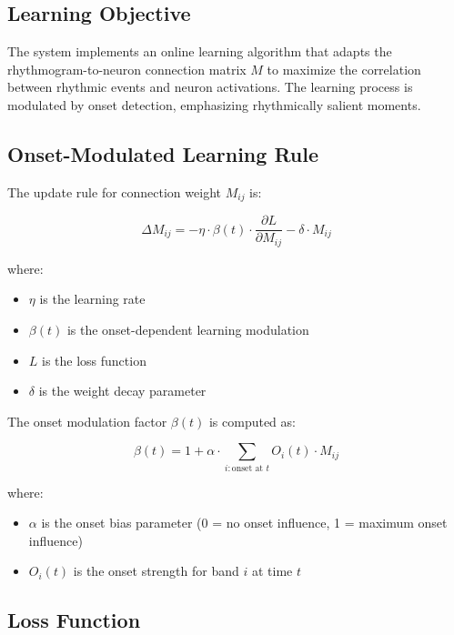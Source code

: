 \documentclass[11pt,a4paper]{article}
\begin{document}
\subsection{Learning Objective}

The system implements an online learning algorithm that adapts the rhythmogram-to-neuron connection matrix $M$ to maximize the correlation between rhythmic events and neuron activations. The learning process is modulated by onset detection, emphasizing rhythmically salient moments.

\subsection{Onset-Modulated Learning Rule}

The update rule for connection weight $M_{ij}$ is:

\begin{equation}
\Delta M_{ij} = -\eta \cdot \beta(t) \cdot \frac{\partial L}{\partial M_{ij}} - \delta \cdot M_{ij}
\end{equation}

\noindent where:
\begin{itemize}
\item $\eta$ is the learning rate
\item $\beta(t)$ is the onset-dependent learning modulation
\item $L$ is the loss function
\item $\delta$ is the weight decay parameter
\end{itemize}

The onset modulation factor $\beta(t)$ is computed as:

\begin{equation}
\beta(t) = 1 + \alpha \cdot \sum_{i: \text{onset at } t} O_i(t) \cdot M_{ij}
\end{equation}

\noindent where:
\begin{itemize}
\item $\alpha$ is the onset bias parameter (0 = no onset influence, 1 = maximum onset influence)
\item $O_i(t)$ is the onset strength for band $i$ at time $t$
\end{itemize}

\subsection{Loss Function}
\end{document}
